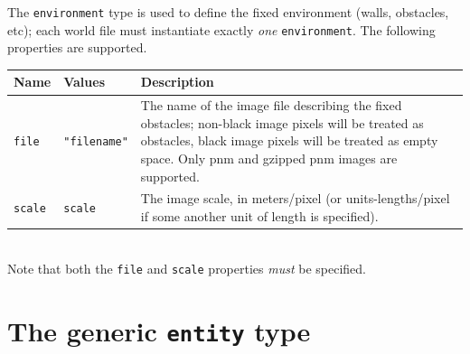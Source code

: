 \documentclass[11pt,twoside]{report}
\begin{document}
The \verb'environment' type is used to define the fixed environment
(walls, obstacles, etc); each world file must instantiate exactly {\em
one} \verb'environment'.  The following properties are supported.
\vspace{1em}\\\noindent
\begin{tabularx}{\columnwidth}{llX}
\hline
Name & Values & Description \\
\hline

\verb'file' & \verb'"filename"' & The name of the image file
describing the fixed obstacles; non-black image pixels will be treated
as obstacles, black image pixels will be treated as empty space.  Only
pnm and gzipped pnm images are supported.\\

\verb'scale' & \verb'scale' & The image scale, in meters/pixel (or
units-lengths/pixel if some another unit of length is specified).\\

\hline
\end{tabularx}
\vspace{1em}\\
\noindent Note that both the \verb'file' and \verb'scale'
properties {\em must} be specified.


\newpage
\section{The generic {\tt entity} type}
\end{document}

